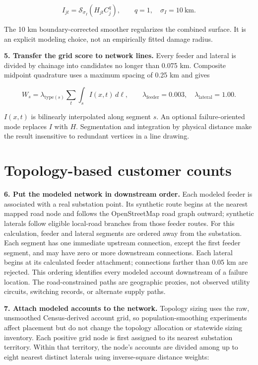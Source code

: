 \documentclass[11pt]{article}
\begin{document}
\begin{equation}
  I_{jt}=\mathcal{S}_{\sigma_I}\!\left(H_{jt}C_j^q\right),
  \qquad q=1,\quad \sigma_I=10\ \text{km}.
  \label{eq:impact}
\end{equation}

The 10 km boundary-corrected smoother regularizes the combined surface. It is an explicit modeling choice, not an empirically fitted damage radius.

\textbf{5. Transfer the grid score to network lines.}
Every feeder and lateral is divided by chainage into candidates no longer than 0.075 km. Composite midpoint quadrature uses a maximum spacing of 0.25 km and gives

\begin{equation}
  W_s=\lambda_{\mathrm{type}(s)}
  \sum_t\int_s I(x,t)\,d\ell,
  \qquad
  \lambda_{\mathrm{feeder}}=0.003,
  \quad
  \lambda_{\mathrm{lateral}}=1.00.
  \label{eq:segment-weight}
\end{equation}

$I(x,t)$ is bilinearly interpolated along segment $s$. An optional failure-oriented mode replaces $I$ with $H$. Segmentation and integration by physical distance make the result insensitive to redundant vertices in a line drawing.

\section*{Topology-based customer counts}

\textbf{6. Put the modeled network in downstream order.}
Each modeled feeder is associated with a real substation point. Its synthetic route begins at the nearest mapped road node and follows the OpenStreetMap road graph outward; synthetic laterals follow eligible local-road branches from those feeder routes. For this calculation, feeder and lateral segments are ordered away from the substation. Each segment has one immediate upstream connection, except the first feeder segment, and may have zero or more downstream connections. Each lateral begins at its calculated feeder attachment; connections farther than 0.05 km are rejected. This ordering identifies every modeled account downstream of a failure location. The road-constrained paths are geographic proxies, not observed utility circuits, switching records, or alternate supply paths.

\textbf{7. Attach modeled accounts to the network.}
Topology sizing uses the raw, unsmoothed Census-derived account grid, so population-smoothing experiments affect placement but do not change the topology allocation or statewide sizing inventory. Each positive grid node is first assigned to its nearest substation territory. Within that territory, the node's accounts are divided among up to eight nearest distinct laterals using inverse-square distance weights:
\end{document}
